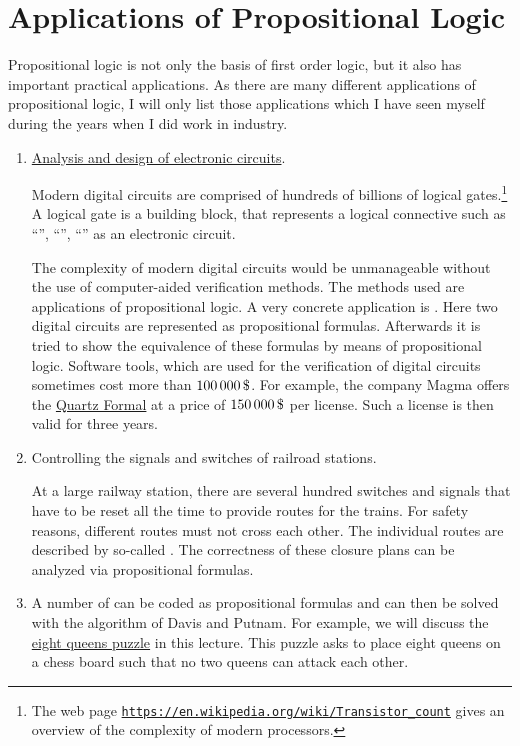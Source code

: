 \section{Applications of Propositional Logic}
Propositional logic is not only the basis of first order logic, but it also has important practical
applications.  As there are many different applications of propositional logic, I will only list those
applications which I have seen myself during the years when I did work in industry.
\begin{enumerate}
\item \href{https://en.wikipedia.org/wiki/Electronic_design_automation}{Analysis and design of electronic circuits}.

      Modern digital circuits are comprised of hundreds of billions of logical gates.\footnote{The web page
      \href{https://en.wikipedia.org/wiki/Transistor_count}{\texttt{https://en.wikipedia.org/wiki/Transistor\_count}}
      gives an overview of the complexity of modern processors.}
      A logical gate  is a building block, that represents a logical connective such as ``'',
      ``'', ``'' as an electronic circuit.

      The complexity of modern digital circuits would be unmanageable without
      the use of computer-aided verification methods.  The methods used are applications of propositional logic. 
      A very concrete application is .  Here two
      digital circuits are represented as propositional formulas.
      Afterwards it is tried to show the equivalence of these formulas by means of propositional logic.
      Software tools, which are used for the verification of digital
      circuits sometimes cost more than $100\,000\,\symbol{36}$.
      For example, the company Magma offers the 
      \href{https://www.eetimes.com/document.asp?doc_id=1217672}{Quartz Formal} at a price
      of $150\,000\,
      \symbol{36}$ per license.  Such a license is then valid for three years.


\item Controlling the signals and switches of railroad stations.

      At a large railway station, there are several hundred switches and signals that have to be 
      reset all the time to provide routes for the trains.
      For safety reasons, different routes must not cross each other.  
      The individual routes are described by so-called .
      The correctness of these closure plans can be analyzed via propositional formulas.
\item A number of  can be coded as propositional formulas and can then be solved with the
      algorithm of Davis and Putnam.
      For example, we will discuss the 
      \href{https://en.wikipedia.org/wiki/Eight_queens_puzzle}{eight queens puzzle} in this lecture.
      This puzzle asks to place eight queens on a chess board such that no two queens can attack each other.
\end{enumerate}

